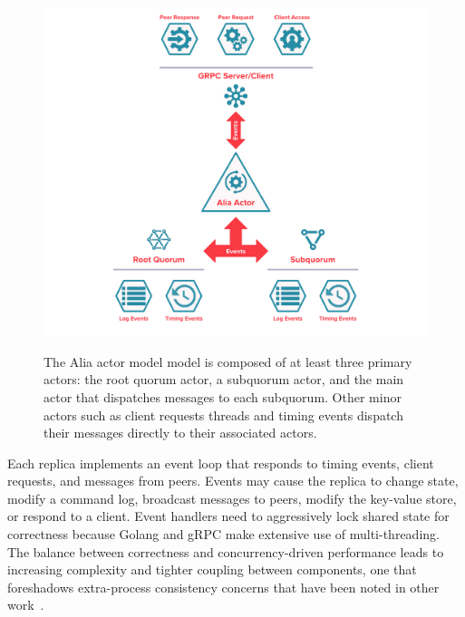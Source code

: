 \begin{figure}
    \begin{center}
        \includegraphics[width=5in]{figures/ch05_hc_actor_model.pdf}
    \end{center}
    \renewcommand{\baselinestretch}{1}
    \small\normalsize

    \begin{quote}
        \caption[Alia Actor Model]{The Alia actor model model is composed of at least three primary actors: the root quorum actor, a subquorum actor, and the main actor that dispatches messages to each subquorum. Other minor actors such as client requests threads and timing events dispatch their messages directly to their associated actors.}
        \label{fig:ch05_hc_actor_model}
    \end{quote}
\end{figure}
\renewcommand{\baselinestretch}{2}
\small\normalsize

Each replica implements an event loop that responds to timing events,
client requests, and messages from peers.
Events may cause the replica to change state, modify a command log, broadcast
messages to peers, modify the key-value store, or respond to a client.
Event
handlers need to aggressively lock shared state for correctness because Golang and
gRPC make extensive use of multi-threading.
The balance between correctness and concurrency-driven performance leads to
increasing complexity and tighter coupling between components, one that
foreshadows extra-process consistency concerns that have been noted in other
work~\cite{paxos_live,raft,raft_students_guide}.

